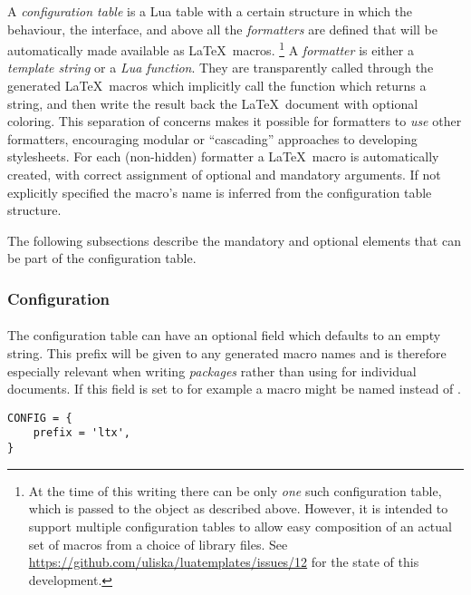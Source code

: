 \documentclass{scrartcl}
\begin{document}
A \emph{configuration table} is a Lua table with a certain structure in which
the behaviour, the interface, and above all the \emph{formatters} are defined
that will be automatically made available as \LaTeX\ macros.%
\footnote{At the time of this writing there can be only \emph{one} such
configuration table, which is passed to the  object
as described above.  However, it is intended to support multiple configuration
tables to allow easy composition of an actual set of macros from a choice of
library files.  See \url{https://github.com/uliska/luatemplates/issues/12}
for the state of this development.} %
A \emph{formatter} is either a \emph{template string} or a \emph{Lua function}.
They are transparently called through the generated \LaTeX\ macros which
implicitly call the function  which
returns a string, and then write the result back the \LaTeX\ document with
optional coloring.  This separation of concerns makes it possible for formatters
to \emph{use} other formatters, encouraging modular or “cascading” approaches to
developing stylesheets. For each (non-hidden) formatter a \LaTeX\ macro is
automatically created, with correct assignment of optional and mandatory
arguments.  If not explicitly specified the macro's name is inferred from the
configuration table structure.

The following subsections describe the mandatory and optional elements that can
be part of the configuration table.


\subsubsection{Configuration}
\label{sec:config-table-configuration}

\paragraph{}

The configuration table can have an optional field  which
defaults to an empty string.  This prefix will be given to any generated macro
names and is therefore especially relevant when writing \emph{packages} rather
than using  for individual documents.  If this field is set
to  for example a macro might be named 
instead of .

\begin{verbatim}
CONFIG = {
    prefix = 'ltx',
}
\end{verbatim}
\end{document}
